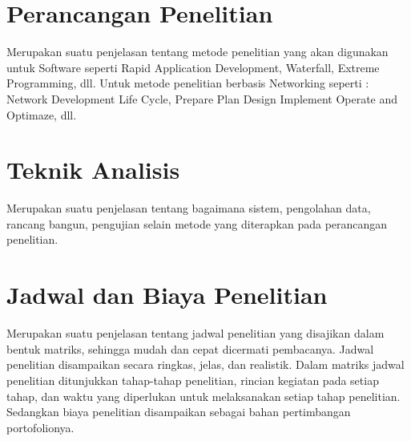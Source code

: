 \section{Perancangan Penelitian}
\begin{sectioncontent}
    \hspace{\parindent}Merupakan suatu penjelasan tentang metode penelitian yang akan  digunakan untuk Software seperti Rapid Application Development, Waterfall, Extreme Programming, dll. Untuk metode penelitian berbasis Networking seperti : Network Development Life Cycle, Prepare Plan Design Implement Operate and Optimaze, dll.
\end{sectioncontent}

\section{Teknik Analisis}
\begin{sectioncontent}
    \hspace{\parindent}Merupakan suatu penjelasan tentang bagaimana sistem, pengolahan data, rancang bangun, pengujian selain metode yang diterapkan pada perancangan penelitian.
\end{sectioncontent}

\section{Jadwal dan Biaya Penelitian}
\begin{sectioncontent}
    \hspace{\parindent}Merupakan suatu penjelasan tentang jadwal penelitian yang disajikan dalam bentuk matriks, sehingga mudah dan cepat dicermati pembacanya. Jadwal penelitian disampaikan secara ringkas, jelas, dan realistik.  Dalam matriks jadwal penelitian ditunjukkan tahap-tahap penelitian, rincian kegiatan pada setiap tahap, dan waktu yang diperlukan untuk melaksanakan setiap tahap penelitian. Sedangkan biaya penelitian disampaikan sebagai bahan pertimbangan portofolionya.
\end{sectioncontent}